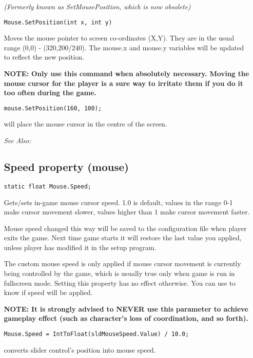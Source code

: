 \it{(Formerly known as SetMousePosition, which is now obsolete)}

\begin{verbatim}
Mouse.SetPosition(int x, int y)
\end{verbatim}

Moves the mouse pointer to screen co-ordinates (X,Y). They are
in the usual range (0,0) - (320,200/240). The mouse.x and mouse.y variables will be
updated to reflect the new position.

\bf{NOTE:} Only use this command when absolutely necessary. Moving the mouse cursor
for the player is a sure way to irritate them if you do it too often during the game.

\begin{verbatim}
mouse.SetPosition(160, 100);
\end{verbatim}
will place the mouse cursor in the centre of the screen.

\it{See Also:} 


\subsection{Speed property (mouse)}\label{Mouse.Speed}%

\begin{verbatim}
static float Mouse.Speed;
\end{verbatim}
Gets/sets in-game mouse cursor speed. 1.0 is default, values in the range 0-1 make cursor movement slower, values higher than 1 make cursor movement faster.

Mouse speed changed this way will be saved to the configuration file when player exits the game. Next time game starts it will restore the last value you applied, unless player has modified it in the setup program.

The custom mouse speed is only applied if mouse cursor movement is currently being controlled by the game, which is usually true only when game is run in fullscreen mode.
Setting this property has no effect otherwise.
You can use  to know if speed will be applied.

\bf{NOTE:} It is strongly advised to \bf{NEVER} use this parameter to achieve gameplay effect (such as character's loss of coordination, and so forth).

\begin{verbatim}
Mouse.Speed = IntToFloat(sldMouseSpeed.Value) / 10.0;
\end{verbatim}
converts slider control's position into mouse speed.

